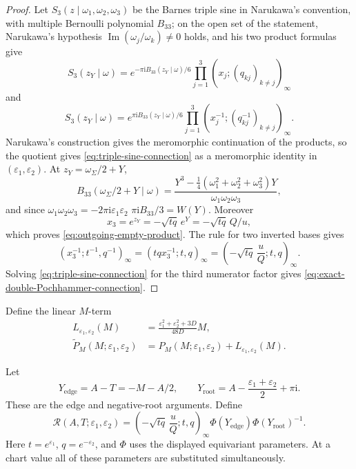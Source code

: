 \documentclass{amsart}
\theoremstyle{definition}
\numberwithin{equation}{section}
\newcommand{\eps}{\varepsilon}
\begin{document}
\begin{proof}
Let \(S_3(z\mid\omega_1,\omega_2,\omega_3)\) be the Barnes triple sine in Narukawa's convention, with multiple Bernoulli polynomial \(B_{33}\); on the open set of the statement, Narukawa's hypothesis \(\operatorname{Im}(\omega_j/\omega_k)\ne0\) holds, and his two product formulas \cite[Section~4]{Narukawa} give
\[
 S_3(z_Y\mid\omega)
 =e^{-\pi\mathrm{i}B_{33}(z_Y\mid\omega)/6}
   \prod_{j=1}^3(x_j;(q_{kj})_{k\ne j})_\infty
\]
and
\[
 S_3(z_Y\mid\omega)
 =e^{\pi\mathrm{i}B_{33}(z_Y\mid\omega)/6}
   \prod_{j=1}^3
   (x_j^{-1};(q_{kj}^{-1})_{k\ne j})_\infty.
\]
Narukawa's construction gives the meromorphic continuation of the products, so the quotient gives \eqref{eq:triple-sine-connection} as a meromorphic identity in \((\eps_1,\eps_2)\).  At \(z_Y=\omega_{\Sigma}/2+Y\),
\[
 B_{33}(\omega_{\Sigma}/2+Y\mid\omega)
 =\frac{Y^3-\frac14
  (\omega_1^2+\omega_2^2+\omega_3^2)Y}
 {\omega_1\omega_2\omega_3},
\]
and since \(\omega_1\omega_2\omega_3=-2\pi\mathrm{i}\eps_1\eps_2\) \(\pi\mathrm{i}B_{33}/3=W(Y)\).  Moreover
\[
 x_3=e^{z_Y}=-\sqrt{tq}\,e^Y
 =-\sqrt{tq}\,Q/u,
\]
which proves \eqref{eq:outgoing-empty-product}.  The rule for two inverted bases gives
\[
 (x_3^{-1};t^{-1},q^{-1})_\infty
 =(tqx_3^{-1};t,q)_\infty
 =\left(-\sqrt{tq}\,\frac uQ;t,q\right)_\infty.
\]
Solving \eqref{eq:triple-sine-connection} for the third numerator factor gives \eqref{eq:exact-double-Pochhammer-connection}.
\end{proof}

Define the linear \(M\)-term
\begin{equation}
\begin{aligned}
 L_{\eps_1,\eps_2}(M)
 &=\frac{\eps_1^2+\eps_2^2+3D}{48D}M,\\
 \widetilde P_M(M;\eps_1,\eps_2)
 &=P_M(M;\eps_1,\eps_2)
  +L_{\eps_1,\eps_2}(M).
\end{aligned}
\label{eq:NY-linear-M-term}
\end{equation}

Let
\begin{equation}
 Y_{\mathrm{edge}}=A-T=-M-A/2,
 \qquad
 Y_{\mathrm{root}}=A-\frac{\eps_1+\eps_2}{2}+\pi\mathrm{i}.
\label{eq:edge-root-arguments}
\end{equation}
These are the edge and negative-root arguments.  Define
\begin{equation}
 \mathcal R(A,T;\eps_1,\eps_2)
 =\left(-\sqrt{tq}\,\frac uQ;t,q\right)_\infty
   \Phi(Y_{\mathrm{edge}})\Phi(Y_{\mathrm{root}})^{-1}.
\label{eq:remaining-product-factor}
\end{equation}
Here \(t=e^{\eps_1}\), \(q=e^{-\eps_2}\), and \(\Phi\) uses the displayed equivariant parameters.  At a chart value all of these parameters are substituted simultaneously.
\end{document}
